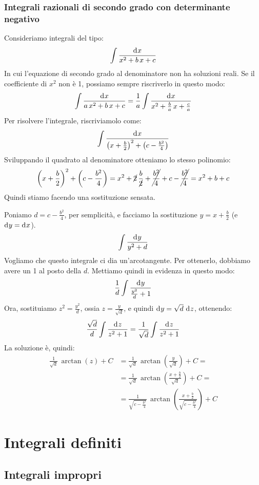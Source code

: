 \subsection{Integrali razionali di secondo grado con determinante negativo}

Consideriamo integrali del tipo:
\[
\int \frac{\diff x}{x^2 + b \, x + c}
\]
In cui l'equazione di secondo grado al denominatore non ha soluzioni reali.
Se il coefficiente di $x^2$ non \`e 1, possiamo sempre riscriverlo in questo
modo:
\[
\int \frac{\diff x}{a \, x^2 + b \, x + c} = 
\frac{1}{a} \int \frac{\diff x}{x^2 + \frac{b}{a} \, x + \frac{c}{a}}
\]
Per risolvere l'integrale, riscriviamolo come:
\[
\int \frac{\diff x}{\left( x + \frac{b}{2} \right)^2 + 
\left( c - \frac{b^2}{4} \right)}
\]
Sviluppando il quadrato al denominatore otteniamo lo stesso polinomio:
\[
\left( x + \frac{b}{2} \right)^2 + \left( c - \frac{b^2}{4} \right) =
x^2 + \cancel{2} \, \frac{b}{\cancel{2}} + \cancel{\frac{b^2}{4}} + c - \cancel{\frac{b^2}{4}} = 
x^2 + b + c
\]
Quindi stiamo facendo una sostituzione sensata.

Poniamo $d = c - \frac{b^2}{4}$, per semplicit\`a, e facciamo la 
sostituzione $y = x + \frac{b}{2}$ (e $\diff y = \diff x$).
\[
\int \frac{\diff y}{y^2 + d}
\]
Vogliamo che questo integrale ci dia un'arcotangente. Per ottenerlo, dobbiamo
avere un 1 al posto della $d$. Mettiamo quindi in evidenza in questo modo:
\[
\frac{1}{d} \int \frac{\diff y}{\frac{y^2}{d} + 1}
\]
Ora, sostituiamo $z^2 = \frac{y^2}{d}$, ossia $z = \frac{y}{\sqrt{d}}$, 
e quindi $\diff y = \sqrt{d} \dx[z]$, ottenendo:
\[
\frac{\sqrt{d}}{d} \int \frac{\diff z}{z^2 + 1} =
\frac{1}{\sqrt{d}} \int \frac{\diff z}{z^2 + 1}
\]
La soluzione \`e, quindi:
\begin{align*}
\frac{1}{\sqrt{d}} \, \arctan \left( z \right) + C &=
\frac{1}{\sqrt{d}} \, \arctan \left( \frac{y}{\sqrt{d}} \right) + C = \\
&= \frac{1}{\sqrt{d}} \, \arctan \left( \frac{x + \frac{b}{2}}{\sqrt{d}} \right) + C = \\
&= \frac{1}{\sqrt{c - \frac{b^2}{4}}} \, \arctan \left( \frac{x + \frac{b}{2}}{\sqrt{c - \frac{b^2}{4}}} \right) + C
\end{align*}

\chapter{Integrali definiti}

\section{Integrali impropri}

